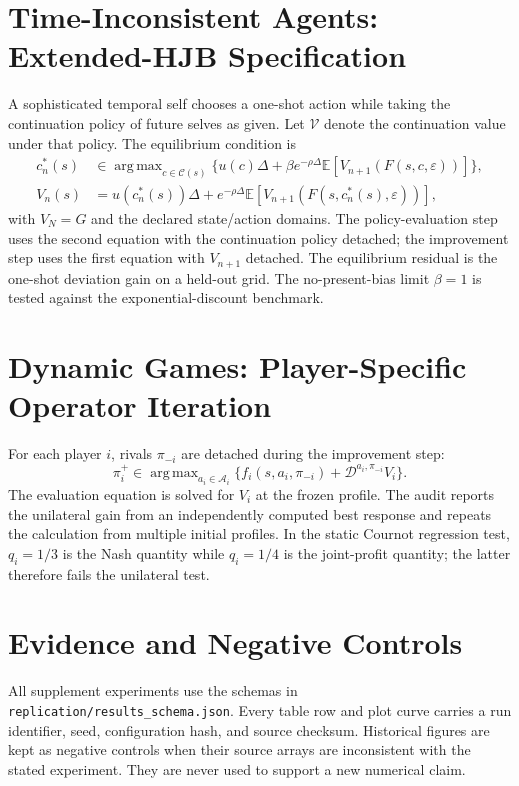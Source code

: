 \documentclass[ecta]{econsocart}
\theoremstyle{plain}
\theoremstyle{remark}
\newcommand{\E}{\mathbb{E}}
\DeclareMathOperator*{\argmax}{arg\,max}
\begin{document}
\section{Time-Inconsistent Agents: Extended-HJB Specification}
A sophisticated temporal self chooses a one-shot action while taking the continuation policy of future selves as given. Let $\mathcal V$ denote the continuation value under that policy. The equilibrium condition is
\begin{align}
 c_n^*(s)&\in\argmax_{c\in\mathcal C(s)}\{u(c)\Delta+\beta e^{-\rho\Delta}\E[V_{n+1}(F(s,c,\varepsilon))]\},\\
 V_n(s)&=u(c_n^*(s))\Delta+e^{-\rho\Delta}\E[V_{n+1}(F(s,c_n^*(s),\varepsilon))],
\label{eq:supp_r2_ehjb}
\end{align}
with $V_N=G$ and the declared state/action domains. The policy-evaluation step uses the second equation with the continuation policy detached; the improvement step uses the first equation with $V_{n+1}$ detached. The equilibrium residual is the one-shot deviation gain on a held-out grid. The no-present-bias limit $\beta=1$ is tested against the exponential-discount benchmark.

\section{Dynamic Games: Player-Specific Operator Iteration}
For each player $i$, rivals $\pi_{-i}$ are detached during the improvement step:
\begin{equation}
\pi_i^{+}\in\argmax_{a_i\in\mathcal A_i}\{f_i(s,a_i,\pi_{-i})+\mathcal D^{a_i,\pi_{-i}}V_i\}.
\label{eq:supp_r2_game}
\end{equation}
The evaluation equation is solved for $V_i$ at the frozen profile. The audit reports the unilateral gain from an independently computed best response and repeats the calculation from multiple initial profiles. In the static Cournot regression test, $q_i=1/3$ is the Nash quantity while $q_i=1/4$ is the joint-profit quantity; the latter therefore fails the unilateral test.

\section{Evidence and Negative Controls}
All supplement experiments use the schemas in \texttt{replication/results\_schema.json}. Every table row and plot curve carries a run identifier, seed, configuration hash, and source checksum. Historical figures are kept as negative controls when their source arrays are inconsistent with the stated experiment. They are never used to support a new numerical claim.
\end{document}
